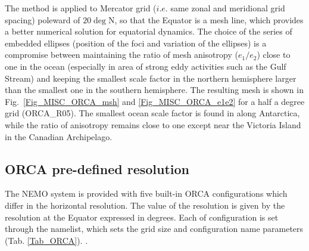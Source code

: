 

The method is applied to Mercator grid ($i.e.$ same zonal and meridional grid spacing) poleward 
of $20\deg$N, so that the Equator is a mesh line, which provides a better numerical solution 
for equatorial dynamics. The choice of the series of embedded ellipses (position of the foci and 
variation of the ellipses) is a compromise between maintaining  the ratio of mesh anisotropy 
($e_1 / e_2$) close to one in the ocean (especially in area of strong eddy activities such as 
the Gulf Stream) and keeping the smallest scale factor in the northern hemisphere larger 
than the smallest one in the southern hemisphere.
The resulting mesh is shown in Fig.~\ref{Fig_MISC_ORCA_msh} and \ref{Fig_MISC_ORCA_e1e2} 
for a half a degree grid (ORCA\_R05). The smallest ocean scale factor is found in along  
Antarctica, while the ratio of anisotropy remains close to one except near the Victoria Island 
in the Canadian Archipelago. 

\subsection{ORCA pre-defined resolution}
\label{CFG_orca_resolution}


The NEMO system is provided with five built-in ORCA configurations which differ in the 
horizontal resolution. The value of the resolution is given by the resolution at the Equator 
expressed in degrees. Each of configuration is set through the \textit{} namelist, 
which sets the grid size and configuration 
name parameters  (Tab. \ref{Tab_ORCA}).
.

